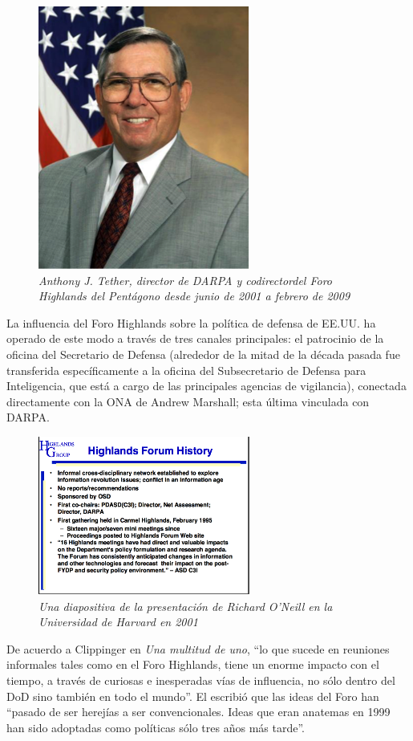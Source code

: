 \documentclass[10pt,a5paper,twoside,spanish,]{book}
\begin{document}
\begin{figure}[htbp]
\centering
\includegraphics{1.4.png}
\caption{\emph{Anthony J. Tether, director de DARPA y codirectordel Foro
Highlands del Pentágono desde junio de 2001 a febrero de 2009}}
\end{figure}

La influencia del Foro Highlands sobre la política de defensa de EE.UU.
ha operado de este modo a través de tres canales principales: el
patrocinio de la oficina del Secretario de Defensa (alrededor de la
mitad de la década pasada fue transferida específicamente a la oficina
del Subsecretario de Defensa para Inteligencia, que está a cargo de las
principales agencias de vigilancia), conectada directamente con la ONA
de Andrew Marshall; esta última vinculada con DARPA.

\begin{figure}[htbp]
\centering
\includegraphics{1.5.png}
\caption{\emph{Una diapositiva de la presentación de Richard O'Neill en
la Universidad de Harvard en 2001}}
\end{figure}

De acuerdo a Clippinger en \emph{Una multitud de uno}, ``lo que sucede
en reuniones informales tales como en el Foro Highlands, tiene un enorme
impacto con el tiempo, a través de curiosas e inesperadas vías de
influencia, no sólo dentro del DoD sino también en todo el mundo''. El
escribió que las ideas del Foro han ``pasado de ser herejías a ser
convencionales. Ideas que eran anatemas en 1999 han sido adoptadas como
políticas sólo tres años más tarde''.
\end{document}
